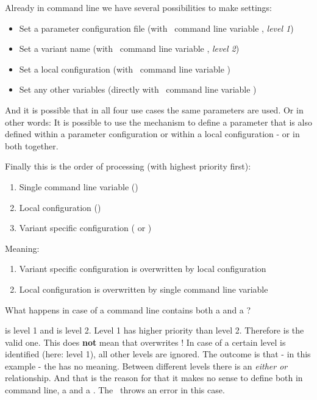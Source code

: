Already in command line we have several possibilities to make settings:

\begin{itemize}
   \item Set a parameter configuration file (with \pkg\ command line variable , \textit{level 1})
   \item Set a variant name (with \pkg\ command line variable , \textit{level 2})
   \item Set a local configuration (with \pkg\ command line variable )
   \item Set any other variables (directly with \rfwcore\ command line variable )
\end{itemize}

And it is possible that in all four use cases the same parameters are used. Or in other words: It is possible to use the
 mechanism to define a parameter that is also defined within a parameter configuration or within a
local configuration - or in both together.

\vspace{2ex}

Finally this is the order of processing (with highest priority first):

\begin{enumerate}
   \item Single command line variable ()
   \item Local configuration ()
   \item Variant specific configuration ( or )
\end{enumerate}

Meaning:

\begin{enumerate}
   \item Variant specific configuration is overwritten by local configuration
   \item Local configuration is overwritten by single command line variable
\end{enumerate}

What happens in case of a command line contains both a  and a ?

 is level 1 and  is level 2. Level 1 has higher priority than level 2. Therefore 
is the valid one. This does \textbf{not} mean that  overwrites ! In case of a certain level is identified
(here: level 1), all other levels are ignored. The outcome is that - in this example - the  has no meaning.
Between different levels there is an \textit{either or} relationship. And that is the reason for that it makes no sense to define both in command line,
a  and a . The \pkg\ throws an error in this case.

